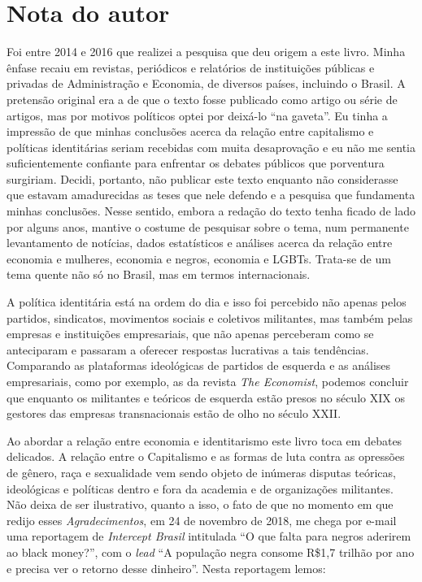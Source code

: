 \chapter{Nota do autor}

Foi entre 2014 e 2016 que realizei a pesquisa que deu origem a este
livro. Minha ênfase recaiu em revistas, periódicos e relatórios de
instituições públicas e privadas de Administração e Economia, de
diversos países, incluindo o Brasil. A pretensão original era a de que o
texto fosse publicado como artigo ou série de artigos, mas por motivos
políticos optei por deixá-lo ``na gaveta''. Eu tinha a impressão de que
minhas conclusões acerca da relação entre capitalismo e políticas
identitárias seriam recebidas com muita desaprovação e eu não me sentia
suficientemente confiante para enfrentar os debates públicos que
porventura surgiriam. Decidi, portanto, não publicar este texto enquanto
não considerasse que estavam amadurecidas as teses que nele defendo e a
pesquisa que fundamenta minhas conclusões. Nesse sentido, embora a
redação do texto tenha ficado de lado por alguns anos, mantive o costume
de pesquisar sobre o tema, num permanente levantamento de notícias,
dados estatísticos e análises acerca da relação entre economia e
mulheres, economia e negros, economia e LGBTs. Trata-se de um tema
quente não só no Brasil, mas em termos internacionais.

A política identitária está na ordem do dia e isso foi percebido não
apenas pelos partidos, sindicatos, movimentos sociais e coletivos
militantes, mas também pelas empresas e instituições empresariais, que
não apenas perceberam como se anteciparam e passaram a oferecer
respostas lucrativas a tais tendências. Comparando as plataformas
ideológicas de partidos de esquerda e as análises empresariais, como por
exemplo, as da revista \emph{The Economist}, podemos concluir que
enquanto os militantes e teóricos de esquerda estão presos no século XIX
os gestores das empresas transnacionais estão de olho no século XXII.

Ao abordar a relação entre economia e identitarismo este livro toca em
debates delicados. A relação entre o Capitalismo e as formas de luta
contra as opressões de gênero, raça e sexualidade vem sendo objeto de
inúmeras disputas teóricas, ideológicas e políticas dentro e fora da
academia e de organizações militantes. Não deixa de ser ilustrativo,
quanto a isso, o fato de que no momento em que redijo esses
\emph{Agradecimentos}, em 24 de novembro de 2018, me chega por e-mail
uma reportagem de \emph{Intercept Brasil} intitulada ``O que falta para
negros aderirem ao black money?'', com o \emph{lead} ``A população negra
consome R\$1,7 trilhão por ano e precisa ver o retorno desse dinheiro''.
Nesta reportagem lemos:

